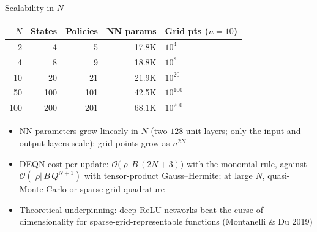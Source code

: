 \documentclass[aspectratio=169,11pt]{beamer}
\newcommand{\emphc}[1]{\textcolor{harvardcrimson}{#1}}
\begin{document}
\begin{frame}{Scalability in $N$}
\begin{center}
\begin{tabular}{rrrrl}
\toprule
$N$ & \textbf{States} & \textbf{Policies} & \textbf{NN params} & \textbf{Grid pts ($n\!=\!10$)} \\
\midrule
2 & 4 & 5 & 17.8K & $10^4$ \\
4 & 8 & 9 & 18.8K & $10^8$ \\
10 & 20 & 21 & 21.9K & $10^{20}$ \\
50 & 100 & 101 & 42.5K & $10^{100}$ \\
100 & 200 & 201 & 68.1K & $10^{200}$ \\
\bottomrule
\end{tabular}
\end{center}

\vspace{0.1em}
\begin{itemize}\itemsep1pt
    \item NN parameters grow \emphc{linearly} in $N$ (two $128$-unit layers; only the input and output layers scale); grid points grow as $n^{2N}$
    \item DEQN cost per update: $\mathcal{O}\bigl(|\rho| \, B \, (2N+3)\bigr)$ with the monomial rule, against $\mathcal{O}(|\rho| \, B \, Q^{N+1})$ with tensor-product Gauss--Hermite; at large $N$, quasi-Monte Carlo or sparse-grid quadrature
    \item Theoretical underpinning: \emphc{deep ReLU networks} beat the curse of dimensionality for sparse-grid-representable functions (Montanelli \& Du 2019)
\end{itemize}
\end{frame}
\end{document}
